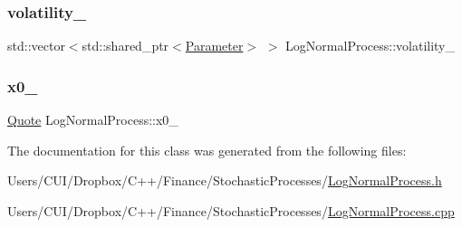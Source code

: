 \hypertarget{class_log_normal_process_ac51be6698f524d4cc5da8ccbdd4e1256}{}\label{class_log_normal_process_ac51be6698f524d4cc5da8ccbdd4e1256} 
\subsubsection{\texorpdfstring{volatility\+\_\+}{volatility\_}}
{\footnotesize\ttfamily std\+::vector$<$std\+::shared\+\_\+ptr$<$\hyperlink{class_parameter}{Parameter}$>$ $>$ Log\+Normal\+Process\+::volatility\+\_\+\hspace{0.3cm}{\ttfamily [private]}}

\hypertarget{class_log_normal_process_a209592d8c0657d00ecbb3072567903e1}{}\label{class_log_normal_process_a209592d8c0657d00ecbb3072567903e1} 
\subsubsection{\texorpdfstring{x0\+\_\+}{x0\_}}
{\footnotesize\ttfamily \hyperlink{_name_def_8h_a642a6c5fd87319d922637de0e0bb0305}{Quote} Log\+Normal\+Process\+::x0\+\_\+\hspace{0.3cm}{\ttfamily [private]}}



The documentation for this class was generated from the following files\+:\begin{DoxyCompactItemize}
\item 
Users/\+C\+U\+I/\+Dropbox/\+C++/\+Finance/\+Stochastic\+Processes/\hyperlink{_log_normal_process_8h}{Log\+Normal\+Process.\+h}\item 
Users/\+C\+U\+I/\+Dropbox/\+C++/\+Finance/\+Stochastic\+Processes/\hyperlink{_log_normal_process_8cpp}{Log\+Normal\+Process.\+cpp}\end{DoxyCompactItemize}
